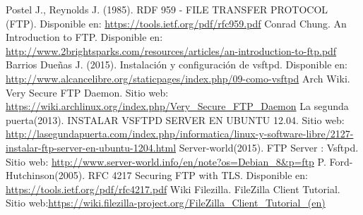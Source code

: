 \def\bibname{\centerline{Referencias}}

\begin{thebibliography}{9}
	
	 Postel J., Reynolds J. (1985). RDF 959 - FILE TRANSFER PROTOCOL (FTP). Disponible en: \url{https://tools.ietf.org/pdf/rfc959.pdf}
	 Conrad Chung. An Introduction to FTP. Disponible en: \url{http://www.2brightsparks.com/resources/articles/an-introduction-to-ftp.pdf}
	 Barrios Dueñas J. (2015). Instalación y configuración de vsftpd. Disponible en: \url{http://www.alcancelibre.org/staticpages/index.php/09-como-vsftpd}
	 Arch Wiki. Very Secure FTP Daemon. Sitio web: \url{https://wiki.archlinux.org/index.php/Very_Secure_FTP_Daemon}
	 La segunda puerta(2013). INSTALAR VSFTPD SERVER EN UBUNTU 12.04. Sitio web: \url{http://lasegundapuerta.com/index.php/informatica/linux-y-software-libre/2127-instalar-ftp-server-en-ubuntu-1204.html}
	 Server-world(2015). FTP Server : Vsftpd. Sitio web: \url{http://www.server-world.info/en/note?os=Debian_8&p=ftp}
	 P. Ford-Hutchinson(2005). RFC 4217 Securing FTP with TLS. Disponible en: \url{https://tools.ietf.org/pdf/rfc4217.pdf}
	 Wiki Filezilla. FileZilla Client Tutorial. Sitio web:\url{https://wiki.filezilla-project.org/FileZilla_Client_Tutorial_(en)}
	
\end{thebibliography}

